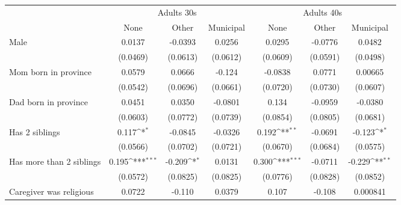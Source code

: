 {
\def\sym#1{\ifmmode^{#1}\else\(^{#1}\)\fi}
\begin{tabular}{l*{6}{c}}
\toprule
	& \multicolumn{3}{c}{Adults 30s} &  \multicolumn{3}{c}{Adults 40s} \\
                    &\multicolumn{1}{c}{None}&\multicolumn{1}{c}{Other}&\multicolumn{1}{c}{Municipal}&\multicolumn{1}{c}{None}&\multicolumn{1}{c}{Other}&\multicolumn{1}{c}{Municipal}\\
\midrule
Male                &      0.0137         &     -0.0393         &      0.0256         &      0.0295         &     -0.0776         &      0.0482         \\
                    &    (0.0469)         &    (0.0613)         &    (0.0612)         &    (0.0609)         &    (0.0591)         &    (0.0498)         \\
\addlinespace
Mom born in province&      0.0579         &      0.0666         &      -0.124         &     -0.0838         &      0.0771         &     0.00665         \\
                    &    (0.0542)         &    (0.0696)         &    (0.0661)         &    (0.0720)         &    (0.0730)         &    (0.0607)         \\
\addlinespace
Dad born in province&      0.0451         &      0.0350         &     -0.0801         &       0.134         &     -0.0959         &     -0.0380         \\
                    &    (0.0603)         &    (0.0772)         &    (0.0739)         &    (0.0854)         &    (0.0805)         &    (0.0681)         \\
\addlinespace
Has 2 siblings      &       0.117\sym{*}  &     -0.0845         &     -0.0326         &       0.192\sym{**} &     -0.0691         &      -0.123\sym{*}  \\
                    &    (0.0566)         &    (0.0702)         &    (0.0721)         &    (0.0670)         &    (0.0684)         &    (0.0575)         \\
\addlinespace
Has more than 2 siblings&       0.195\sym{***}&      -0.209\sym{*}  &      0.0131         &       0.300\sym{***}&     -0.0711         &      -0.229\sym{**} \\
                    &    (0.0572)         &    (0.0825)         &    (0.0825)         &    (0.0776)         &    (0.0828)         &    (0.0852)         \\
\addlinespace
Caregiver was religious&      0.0722         &      -0.110         &      0.0379         &       0.107         &      -0.108         &    0.000841         \\

\end{tabular}}
